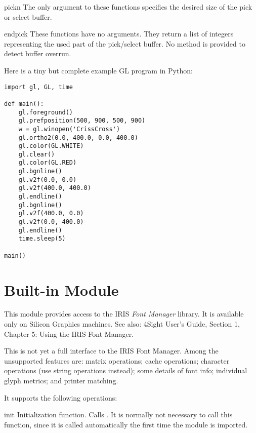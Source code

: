 \begin{funcdesc}{pick}{n}
The only argument to these functions specifies the desired size of the
pick or select buffer.
\end{funcdesc}

\begin{funcdesc}{endpick}{}
These functions have no arguments.
They return a list of integers representing the used part of the
pick/select buffer.
No method is provided to detect buffer overrun.
\end{funcdesc}

Here is a tiny but complete example GL program in Python:

\bcode\begin{verbatim}
import gl, GL, time

def main():
    gl.foreground()
    gl.prefposition(500, 900, 500, 900)
    w = gl.winopen('CrissCross')
    gl.ortho2(0.0, 400.0, 0.0, 400.0)
    gl.color(GL.WHITE)
    gl.clear()
    gl.color(GL.RED)
    gl.bgnline()
    gl.v2f(0.0, 0.0)
    gl.v2f(400.0, 400.0)
    gl.endline()
    gl.bgnline()
    gl.v2f(400.0, 0.0)
    gl.v2f(0.0, 400.0)
    gl.endline()
    time.sleep(5)

main()
\end{verbatim}\ecode

\section{Built-in Module }

This module provides access to the IRIS {\em Font Manager} library.
It is available only on Silicon Graphics machines.
See also: 4Sight User's Guide, Section 1, Chapter 5: Using the IRIS
Font Manager.

This is not yet a full interface to the IRIS Font Manager.
Among the unsupported features are: matrix operations; cache
operations; character operations (use string operations instead); some
details of font info; individual glyph metrics; and printer matching.

It supports the following operations:

\renewcommand{\indexsubitem}{(in module fm)}
\begin{funcdesc}{init}{}
Initialization function.
Calls .
It is normally not necessary to call this function, since it is called
automatically the first time the  module is imported.
\end{funcdesc}

